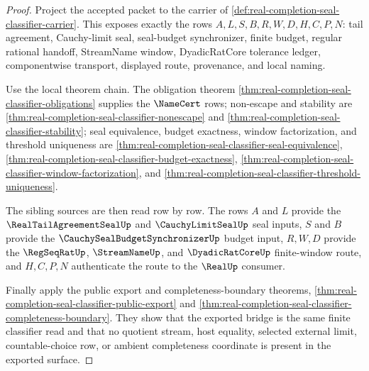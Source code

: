 \begin{proof}
Project the accepted packet to the carrier of \autoref{def:real-completion-seal-classifier-carrier}. This exposes exactly the rows $A,L,S,B,R,W,D,H,C,P,N$: tail agreement, Cauchy-limit seal, seal-budget synchronizer, finite budget, regular rational handoff, StreamName window, DyadicRatCore tolerance ledger, componentwise transport, displayed route, provenance, and local naming.

Use the local theorem chain. The obligation theorem \autoref{thm:real-completion-seal-classifier-obligations} supplies the $\NameCert$ rows; non-escape and stability are \autoref{thm:real-completion-seal-classifier-nonescape} and \autoref{thm:real-completion-seal-classifier-stability}; seal equivalence, budget exactness, window factorization, and threshold uniqueness are \autoref{thm:real-completion-seal-classifier-seal-equivalence}, \autoref{thm:real-completion-seal-classifier-budget-exactness}, \autoref{thm:real-completion-seal-classifier-window-factorization}, and \autoref{thm:real-completion-seal-classifier-threshold-uniqueness}.

The sibling sources are then read row by row. The rows $A$ and $L$ provide the $\RealTailAgreementSealUp$ and $\CauchyLimitSealUp$ seal inputs, $S$ and $B$ provide the $\CauchySealBudgetSynchronizerUp$ budget input, $R,W,D$ provide the $\RegSeqRatUp$, $\StreamNameUp$, and $\DyadicRatCoreUp$ finite-window route, and $H,C,P,N$ authenticate the route to the $\RealUp$ consumer.

Finally apply the public export and completeness-boundary theorems, \autoref{thm:real-completion-seal-classifier-public-export} and \autoref{thm:real-completion-seal-classifier-completeness-boundary}. They show that the exported bridge is the same finite classifier read and that no quotient stream, host equality, selected external limit, countable-choice row, or ambient completeness coordinate is present in the exported surface.
\end{proof}

